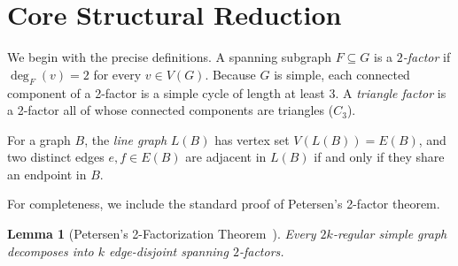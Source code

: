 \documentclass[11pt,reqno]{amsart}
\newtheorem{lemma}[theorem]{Lemma}
\theoremstyle{definition}
\theoremstyle{remark}
\begin{document}
\section{Core Structural Reduction}\label{sec:structural-reduction}

We begin with the precise definitions. A spanning subgraph $F \subseteq G$ is a \emph{$2$-factor} if $\deg_F(v) = 2$ for every $v \in V(G)$. Because $G$ is simple, each connected component of a 2-factor is a simple cycle of length at least $3$. A \emph{triangle factor} is a 2-factor all of whose connected components are triangles ($C_3$). 

For a graph $B$, the \emph{line graph} $L(B)$ has vertex set $V(L(B)) = E(B)$, and two distinct edges $e, f \in E(B)$ are adjacent in $L(B)$ if and only if they share an endpoint in $B$.

For completeness, we include the standard proof of Petersen's 2-factor theorem.

\begin{lemma}[Petersen's 2-Factorization Theorem~\cite{Pe91}]\label{lem:petersen}
Every $2k$-regular simple graph decomposes into $k$ edge-disjoint spanning $2$-factors.
\end{lemma}
\end{document}
